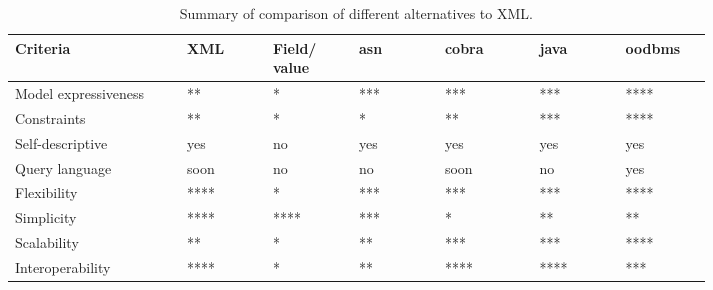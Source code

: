 \begin{table}[h!]
    \centering
    \begin{tabular}{|m{0.20\linewidth}|m{0.10\linewidth}|m{0.10\linewidth}|m{0.10\linewidth}|m{0.11\linewidth}|m{0.10\linewidth}|m{0.10\linewidth}|}
        \hline

        \textbf{Criteria}                      & \textbf{XML}        & \textbf{{\small Field/ value} }        & \textbf{{\small \gls{asn}}}    & \textbf{{\small \gls{cobra}}} &\textbf{{\small \gls{java}}}      & \textbf{{\small \gls{oodbms}}}      \\

        \hline
        Model expressiveness 	& **	& *		& *** & *** & *** & ****     \\
        
        \hline
        Constraints	    & **	& *	& *    & **   & ***   & ****       \\
        
        \hline
        Self-descriptive    & yes	& no	& yes    & yes   &  yes  &  yes      \\
        
        \hline
        Query language	 & soon 	& no	& no    & soon    & no   &  yes \\
        
        \hline
        Flexibility	 & ****	& *	& ***    &  ***  & ***   & ****  \\
        
        \hline
        Simplicity 	 & ****	& ****	& ***    & *   & **   & **  \\
        
        \hline
        Scalability 	 & **	& *	& **   & ***   & ***   & ****  \\
        
        \hline
        Interoperability 	 & ****	& *	&  **  & ****   & ****   & ***  \\
                
        \hline
    \end{tabular} 

    \caption{Summary of comparison of different alternatives to XML.}
    \label{tab:xmlcomparaison}
\end{table}